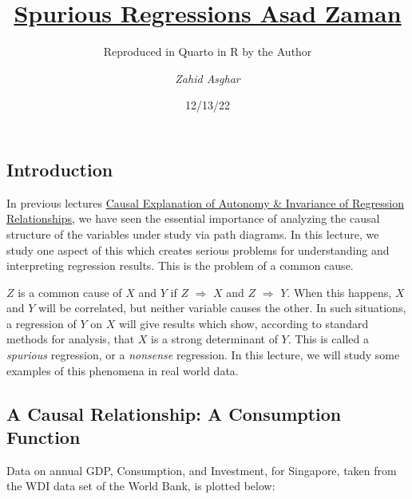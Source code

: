 \documentclass[
  letterpaper,
  DIV=11,
  numbers=noendperiod]{scrartcl}
\title{\textbf{\href{https://weapedagogy.wordpress.com/2021/04/30/spurious-regressions/}{Spurious
Regressions Asad Zaman} }}
\subtitle{Reproduced in Quarto in R by the Author}
\author{\emph{Zahid Asghar }}
\date{12/13/22}
\renewcommand*\contentsname{Table of contents}
\newcommand\contentsname{Table of contents}
\begin{document}
\maketitle
\ifdefined\Shaded\renewenvironment{Shaded}{\begin{tcolorbox}[borderline west={3pt}{0pt}{shadecolor}, frame hidden, breakable, boxrule=0pt, enhanced, interior hidden, sharp corners]}{\end{tcolorbox}}\fi

\renewcommand*\contentsname{Table of contents}
{
\hypersetup{linkcolor=}
\setcounter{tocdepth}{3}
\tableofcontents
}
\hypertarget{introduction}{%
\subsection{Introduction}\label{introduction}}

In previous lectures
\href{https://weapedagogy.wordpress.com/2021/04/19/causal-explanation-of-autonomy-invariance-of-regression-relationships/}{Causal
Explanation of Autonomy \& Invariance of Regression Relationships}, we
have seen the essential importance of analyzing the causal structure of
the variables under study via path diagrams. In this lecture, we study
one aspect of this which creates serious problems for understanding and
interpreting regression results. This is the problem of a common cause.

\(Z\) is a common cause of \(X\) and \(Y\) if \(Z\) \(\Rightarrow\)
\(X\) and \(Z\) \(\Rightarrow\) \(Y\). When this happens, \(X\) and
\(Y\) will be correlated, but neither variable causes the other. In such
situations, a regression of \(Y\) on \(X\) will give results which show,
according to standard methods for analysis, that \(X\) is a strong
determinant of \(Y\). This is called a \emph{spurious} regression, or a
\emph{nonsense} regression. In this lecture, we will study some examples
of this phenomena in real world data.

\hypertarget{a-causal-relationship-a-consumption-function}{%
\subsection{A Causal Relationship: A Consumption
Function}\label{a-causal-relationship-a-consumption-function}}

Data on annual GDP, Consumption, and Investment, for Singapore, taken
from the WDI data set of the World Bank, is plotted below:
\end{document}
